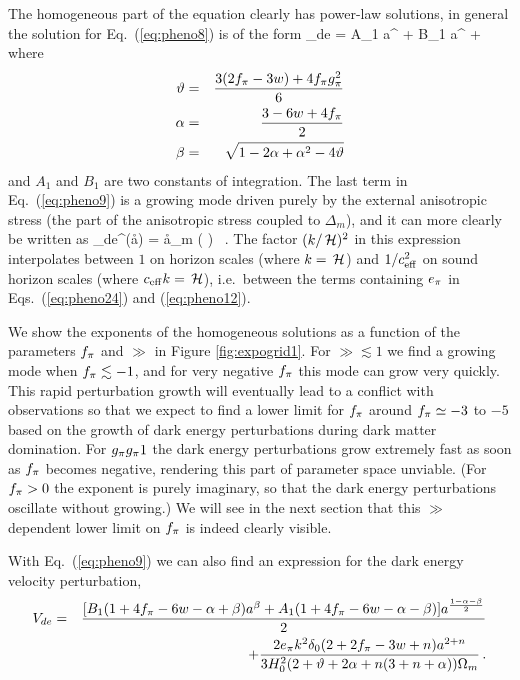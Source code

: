 The homogeneous part of the equation clearly has power-law solutions, in general the solution for Eq.\ (\ref{eq:pheno8}) is of the form
\be 
\delta_{de} = A_1 a^{} + B_1 a^{} +  
\label{eq:pheno9}
\ee
where 
\begin{eqnarray}
\vartheta & = & \frac{3 (2 \ff - 3 w)  + 4 \ff \gg^2 }{6}   \\
\alpha & = & \frac{3 - 6 w + 4 \ff}{2}\\ 
\beta & = &  \sqrt{1-2\alpha + \alpha^2 -4 \vartheta }
\label{eq:pheno10}
\end{eqnarray}
and $ A_1 $ and $ B_1 $ are two constants of integration. The last term in Eq.\ (\ref{eq:pheno9}) is a growing mode driven purely by the external anisotropic stress (the part of the anisotropic stress coupled to $\Delta_m$), and it can more clearly be written as
\be
\delta_{de}^{(\aa)} = 
\aa \delta_m \left( \right)  \, .
\ee
The factor $(k/\H)^2$ in this expression interpolates between $1$ on horizon scales (where $k=\H$) and $1/\ceff^2$ on sound horizon scales (where $\ceff k = \H$), i.e.\ between the terms containing $\aa$ in Eqs.\ (\ref{eq:pheno24}) and (\ref{eq:pheno12}).

We show the exponents of the homogeneous solutions as a function of the parameters $\ff$ and $\gg$ in Figure \ref{fig:expogrid1}. For $\gg \lesssim 1$ we find a growing mode when $\ff \lesssim -1$, and for very negative $\ff$ this mode can grow very quickly. This rapid perturbation growth will eventually lead to a conflict with observations so that we expect to find a lower limit for $\ff$ around $\ff \simeq -3$ to $-5$ based on the growth of dark energy perturbations during dark matter domination. For $\gg \mug 1$ the dark energy perturbations grow extremely fast as soon as $\ff$ becomes negative, rendering this part of parameter space unviable. (For $\ff>0$ the exponent is purely imaginary, so that the dark energy perturbations oscillate without growing.) We will see in the next section that this $\gg$ dependent lower limit on $\ff$ is indeed clearly visible.

With Eq.\ (\ref{eq:pheno9}) we can also find an expression for the dark energy velocity perturbation,   
\begin{eqnarray} 
V_{de} & = & \frac{[B_1 (1+ 4\ff - 6w - \alpha + \beta) a^\beta + A_1 (1+4\ff -6w-\alpha - \beta) ] a^{\frac{1-\alpha - \beta}{2}} }{2} \nonumber \\
&&+ \frac{2 \aa k^2 \delta_0 (2+2\ff -3w + n)a^{2+n}}{3 H_0^2 (2+\vartheta + 2\alpha +n(3+n+\alpha))\Omega_m} \, .
\label{eq:pheno9b}
\end{eqnarray}

